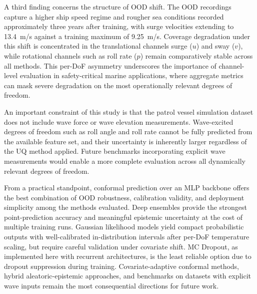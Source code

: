 \documentclass[a4paper,fleqn]{cas-sc}
\begin{document}
A third finding concerns the structure of OOD shift. The OOD recordings capture a higher ship speed regime and rougher sea conditions recorded approximately three years after training, with surge velocities extending to 13.4~m/s against a training maximum of 9.25~m/s. Coverage degradation under this shift is concentrated in the translational channels surge ($u$) and sway ($v$), while rotational channels such as roll rate ($p$) remain comparatively stable across all methods. This per-DoF asymmetry underscores the importance of channel-level evaluation in safety-critical marine applications, where aggregate metrics can mask severe degradation on the most operationally relevant degrees of freedom.

An important constraint of this study is that the patrol vessel simulation dataset does not include wave force or wave elevation measurements. Wave-excited degrees of freedom such as roll angle and roll rate cannot be fully predicted from the available feature set, and their uncertainty is inherently larger regardless of the UQ method applied. Future benchmarks incorporating explicit wave measurements would enable a more complete evaluation across all dynamically relevant degrees of freedom.

From a practical standpoint, conformal prediction over an MLP backbone offers the best combination of OOD robustness, calibration validity, and deployment simplicity among the methods evaluated. Deep ensembles provide the strongest point-prediction accuracy and meaningful epistemic uncertainty at the cost of multiple training runs. Gaussian likelihood models yield compact probabilistic outputs with well-calibrated in-distribution intervals after per-DoF temperature scaling, but require careful validation under covariate shift. MC Dropout, as implemented here with recurrent architectures, is the least reliable option due to dropout suppression during training. Covariate-adaptive conformal methods, hybrid aleatoric-epistemic approaches, and benchmarks on datasets with explicit wave inputs remain the most consequential directions for future work.



% 

% 

\end{document}
